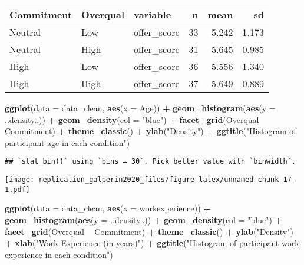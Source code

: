 \documentclass[]{article}
\newenvironment{Shaded}{\begin{snugshade}}{\end{snugshade}}
\newcommand{\DataTypeTok}[1]{\textcolor[rgb]{0.13,0.29,0.53}{#1}}
\newcommand{\KeywordTok}[1]{\textcolor[rgb]{0.13,0.29,0.53}{\textbf{#1}}}
\newcommand{\NormalTok}[1]{#1}
\newcommand{\OperatorTok}[1]{\textcolor[rgb]{0.81,0.36,0.00}{\textbf{#1}}}
\newcommand{\StringTok}[1]{\textcolor[rgb]{0.31,0.60,0.02}{#1}}
\begin{document}
\begin{longtable}[]{@{}lllrrr@{}}
\toprule
Commitment & Overqual & variable & n & mean & sd\tabularnewline
\midrule
\endhead
Neutral & Low & offer\_score & 33 & 5.242 & 1.173\tabularnewline
Neutral & High & offer\_score & 31 & 5.645 & 0.985\tabularnewline
High & Low & offer\_score & 36 & 5.556 & 1.340\tabularnewline
High & High & offer\_score & 37 & 5.649 & 0.889\tabularnewline
\bottomrule
\end{longtable}

\begin{Shaded}
\begin{Highlighting}[]
\KeywordTok{ggplot}\NormalTok{(}\DataTypeTok{data =}\NormalTok{ data_clean, }\KeywordTok{aes}\NormalTok{(}\DataTypeTok{x =}\NormalTok{ Age)) }\OperatorTok{+}
\StringTok{  }\KeywordTok{geom_histogram}\NormalTok{(}\KeywordTok{aes}\NormalTok{(}\DataTypeTok{y =}\NormalTok{ ..density..)) }\OperatorTok{+}
\StringTok{  }\KeywordTok{geom_density}\NormalTok{(}\DataTypeTok{col =} \StringTok{"blue"}\NormalTok{) }\OperatorTok{+}
\StringTok{  }\KeywordTok{facet_grid}\NormalTok{(Overqual }\OperatorTok{~}\StringTok{ }\NormalTok{Commitment) }\OperatorTok{+}
\StringTok{  }\KeywordTok{theme_classic}\NormalTok{() }\OperatorTok{+}
\StringTok{  }\KeywordTok{ylab}\NormalTok{(}\StringTok{"Density"}\NormalTok{) }\OperatorTok{+}
\StringTok{  }\KeywordTok{ggtitle}\NormalTok{(}\StringTok{"Histogram of participant age in each condition"}\NormalTok{)}
\end{Highlighting}
\end{Shaded}

\begin{verbatim}
## `stat_bin()` using `bins = 30`. Pick better value with `binwidth`.
\end{verbatim}

\texttt{[image: replication\_galperin2020\_files/figure-latex/unnamed-chunk-17-1.pdf]}

\begin{Shaded}
\begin{Highlighting}[]
\KeywordTok{ggplot}\NormalTok{(}\DataTypeTok{data =}\NormalTok{ data_clean, }\KeywordTok{aes}\NormalTok{(}\DataTypeTok{x =}\NormalTok{ workexperience)) }\OperatorTok{+}
\StringTok{  }\KeywordTok{geom_histogram}\NormalTok{(}\KeywordTok{aes}\NormalTok{(}\DataTypeTok{y =}\NormalTok{ ..density..)) }\OperatorTok{+}
\StringTok{  }\KeywordTok{geom_density}\NormalTok{(}\DataTypeTok{col =} \StringTok{"blue"}\NormalTok{) }\OperatorTok{+}
\StringTok{  }\KeywordTok{facet_grid}\NormalTok{(Overqual }\OperatorTok{~}\StringTok{ }\NormalTok{Commitment) }\OperatorTok{+}
\StringTok{  }\KeywordTok{theme_classic}\NormalTok{() }\OperatorTok{+}
\StringTok{  }\KeywordTok{ylab}\NormalTok{(}\StringTok{"Density"}\NormalTok{) }\OperatorTok{+}
\StringTok{  }\KeywordTok{xlab}\NormalTok{(}\StringTok{"Work Experience (in years)"}\NormalTok{) }\OperatorTok{+}
\StringTok{  }\KeywordTok{ggtitle}\NormalTok{(}\StringTok{"Histogram of participant work experience in each condition"}\NormalTok{)}
\end{Highlighting}
\end{Shaded}
\end{document}
